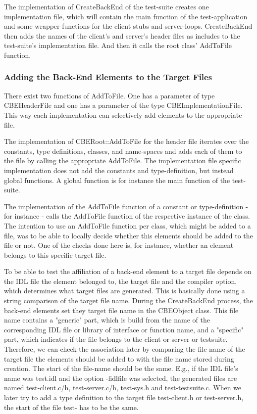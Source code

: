 The implementation of CreateBackEnd of the test-suite creates one
implementation file, which will contain the main function of the
test-application and some wrapper functions for the client stubs and
server-loops. CreateBackEnd then adds the names of the client's and
server's header files as includes to the test-suite's implementation
file. And then it calls the root class' AddToFile function.

\subsubsection{Adding the Back-End Elements to the Target Files}

There exist two functions of AddToFile. One has a parameter of type
CBEHeaderFile and one has a parameter of the type
CBEImplementationFile. This way each implementation can selectively
add elements to the appropriate file.

The implementation of CBERoot::AddToFile for the header file iterates
over the constants, type definitions, classes, and name-spaces and
adds each of them to the file by calling the appropriate
AddToFile. The implementation file specific implementation does not
add the constants and type-definition, but instead global functions. A
global function is for instance the main function of the test-suite.

The implementation of the AddToFile function of a constant or
type-definition - for instance - calls the AddToFile function of the
respective instance of the class. The intention to use an AddToFile
function per class, which might be added to a file, was to be able to
locally decide whether this elements should be added to the file or
not. One of the checks done here is, for instance, whether an element
belongs to this specific target file.

To be able to test the affiliation of a back-end element to a target
file depends on the IDL file the element belonged to, the target file
and the compiler option, which determines what target files are
generated. This is basically done using a string comparison of the
target file name. During the CreateBackEnd process, the back-end
elements set they target file name in the CBEObject class. This file
name contains a "generic" part, which is build from the name of the
corresponding IDL file or library of interface or function name, and a
"specific" part, which indicates if the file belongs to the client or
server or testsuite. Therefore, we can check the association later by
comparing the file name of the target file the elements should be
added to with the file name stored during creation. The start of the
file-name should be the same. E.g., if the IDL file's name was
test.idl and the option -fidlfile was selected, the generated files
are named test-client.c/h, test-server.c/h, test-sys.h and
test-testsuite.c. When we later try to add a type definition to the
target file test-client.h or test-server.h, the start of the file
test- has to be the same.

